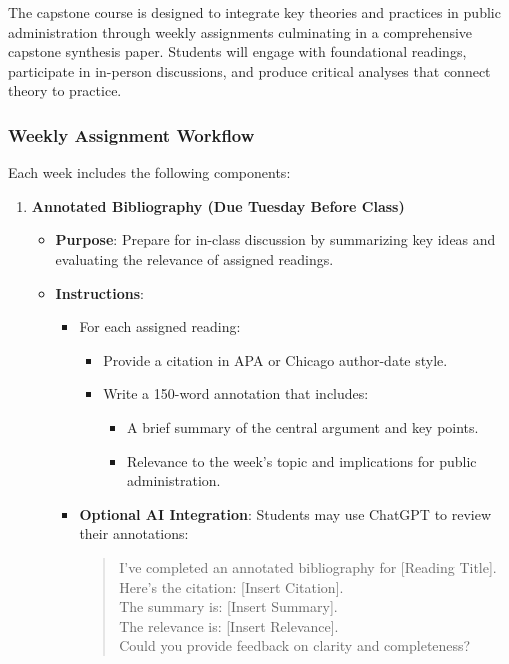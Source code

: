 \documentclass[11pt, letterpaper]{article}
\begin{document}
The capstone course is designed to integrate key theories and practices in public administration through weekly assignments culminating in a comprehensive capstone synthesis paper. Students will engage with foundational readings, participate in in-person discussions, and produce critical analyses that connect theory to practice.

\subsubsection*{Weekly Assignment Workflow}

Each week includes the following components:

\begin{enumerate}
    \item \textbf{Annotated Bibliography (Due Tuesday Before Class)}
    \begin{itemize}
        \item \textbf{Purpose}: Prepare for in-class discussion by summarizing key ideas and evaluating the relevance of assigned readings.
        \item \textbf{Instructions}:
        \begin{itemize}
            \item For each assigned reading:
            \begin{itemize}
                \item Provide a citation in APA or Chicago author-date style.
                \item Write a 150-word annotation that includes:
                \begin{itemize}
                    \item A brief summary of the central argument and key points.
                    \item Relevance to the week’s topic and implications for public administration.
                \end{itemize}
            \end{itemize}
            \item \textbf{Optional AI Integration}: Students may use ChatGPT to review their annotations:
            \begin{quote}
                I’ve completed an annotated bibliography for [Reading Title]. Here’s the citation: [Insert Citation]. \\ 
                The summary is: [Insert Summary]. \\ 
                The relevance is: [Insert Relevance]. \\ 
                Could you provide feedback on clarity and completeness?
            \end{quote}
        \end{itemize}
    \end{itemize}


\end{enumerate}
\end{document}
